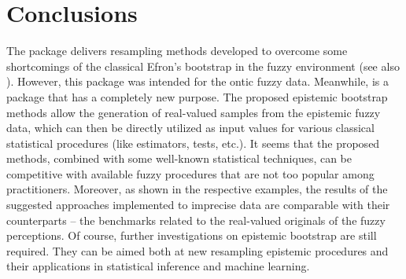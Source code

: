 \section{Conclusions}
The  package delivers resampling methods developed to overcome some shortcomings of the classical Efron's bootstrap in the fuzzy environment (see also \cite{fuzzyResamplingArt}).
However, this package was intended for the ontic fuzzy data.
Meanwhile,  is a package that has a completely new purpose. The proposed epistemic bootstrap methods allow the generation of real-valued samples from the epistemic fuzzy data, which can then be directly utilized as input values for various classical statistical procedures (like estimators, tests, etc.). It seems that the proposed methods, combined with some well-known statistical techniques, can be competitive with available fuzzy procedures that are not too popular among practitioners. Moreover, as shown in the respective examples, the results of the suggested approaches implemented to imprecise data are comparable with their counterparts -- the benchmarks related to the real-valued originals of the fuzzy perceptions.
Of course, further investigations on epistemic bootstrap are still required. They can be aimed both at new resampling epistemic procedures and their applications in statistical inference and machine learning.

\address{Maciej Romaniuk\\
    Systems Research Institute Polish Academy of Sciences\\
    Newelska 6, 01-447 Warsaw\\
    Poland\\
	WIT Academy\\
    Newelska 6, 01-447 Warsaw\\
    Poland\\
    (0000-0001-9649-396X)\\
    }
\address{Przemys{\l}aw Grzegorzewski\\
    Faculty of Mathematics and Information Science, Warsaw University of Technology \\
    Koszykowa 75, 00-662 Warsaw\\
    Poland\\
    Systems Research Institute Polish Academy of Sciences\\
    Newelska 6, 01-447 Warsaw\\
    Poland\\
    (0000-0002-5191-4123)\\
    }
\address{Abbas Parchami\\
       Department of Statistics, Faculty of Mathematics and Computer\\
       Shahid Bahonar University of Kerman, Kerman\\
       Iran\\
       (0000-0002-0593-7324)\\
       }
